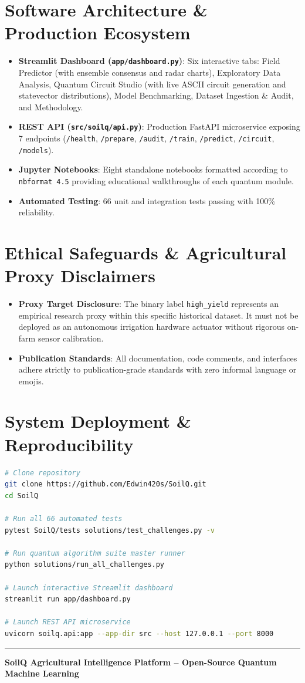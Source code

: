 \documentclass[10pt,a4paper]{article}
\begin{document}
\section{Software Architecture \& Production Ecosystem}
\begin{itemize}
    \item \textbf{Streamlit Dashboard (\texttt{app/dashboard.py})}: Six interactive tabs: Field Predictor (with ensemble consensus and radar charts), Exploratory Data Analysis, Quantum Circuit Studio (with live ASCII circuit generation and statevector distributions), Model Benchmarking, Dataset Ingestion \& Audit, and Methodology.
    \item \textbf{REST API (\texttt{src/soilq/api.py})}: Production FastAPI microservice exposing 7 endpoints (\texttt{/health}, \texttt{/prepare}, \texttt{/audit}, \texttt{/train}, \texttt{/predict}, \texttt{/circuit}, \texttt{/models}).
    \item \textbf{Jupyter Notebooks}: Eight standalone notebooks formatted according to \texttt{nbformat 4.5} providing educational walkthroughs of each quantum module.
    \item \textbf{Automated Testing}: 66 unit and integration tests passing with 100\% reliability.
\end{itemize}

\section{Ethical Safeguards \& Agricultural Proxy Disclaimers}
\begin{itemize}
    \item \textbf{Proxy Target Disclosure}: The binary label \texttt{high\_yield} represents an empirical research proxy within this specific historical dataset. It must not be deployed as an autonomous irrigation hardware actuator without rigorous on-farm sensor calibration.
    \item \textbf{Publication Standards}: All documentation, code comments, and interfaces adhere strictly to publication-grade standards with zero informal language or emojis.
\end{itemize}

\section{System Deployment \& Reproducibility}
\begin{lstlisting}[language=bash]
# Clone repository
git clone https://github.com/Edwin420s/SoilQ.git
cd SoilQ

# Run all 66 automated tests
pytest SoilQ/tests solutions/test_challenges.py -v

# Run quantum algorithm suite master runner
python solutions/run_all_challenges.py

# Launch interactive Streamlit dashboard
streamlit run app/dashboard.py

# Launch REST API microservice
uvicorn soilq.api:app --app-dir src --host 127.0.0.1 --port 8000
\end{lstlisting}

\vspace{10pt}
\hrule
\vspace{6pt}
\begin{center}
    \footnotesize \textbf{SoilQ Agricultural Intelligence Platform -- Open-Source Quantum Machine Learning}
\end{center}
\end{document}
